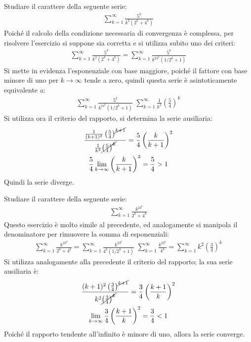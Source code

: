 \documentclass{article}
\numberwithin{equation}{subsection}
\begin{document}
Studiare il carattere della seguente serie:
\begin{gather*}
    \displaystyle\sum_{k=1}^\infty\frac{5^k}{k^2(2^k+4^k)}
\end{gather*}
Poiché il calcolo della condizione necessaria di convergenza è complessa, per risolvere l'esercizio si suppone sia corretta e si utilizza subito uno dei criteri:
\begin{gather*}
    \displaystyle\sum_{k=1}^\infty\frac{5^k}{k^2(2^k+4^k)}=
    \displaystyle\sum_{k=1}^\infty\frac{5^k}{k^24^k(1/2^k+1)}
\end{gather*}
Si mette in evidenza l'esponenziale con base maggiore, poiché il fattore con base minore di uno per $k\to\infty$ tende a zero, quindi questa serie è asintoticamente equivalente a:
\begin{gather*}
    \displaystyle\sum_{k=1}^\infty\frac{5^k}{k^24^k(1/2^k+1)}\mbox{~}
    \displaystyle\sum_{k=1}^\infty\frac{1}{k^2}\left(\frac{5}{4}\right)^k
\end{gather*}
Si utilizza ora il criterio del rapporto, si determina la serie ausiliaria:
\begin{gather*}
    \displaystyle\frac{\frac{1}{(k+1)^2}\left(\frac{5}{4}\right)^{\cancel{k+1}}}{\frac{1}{k^2}\cancel{\left(\frac{5}{4}\right)^k}}=\frac{5}{4}\left(\frac{k}{k+1}\right)^2\\
    \frac{5}{4}\lim_{k\to\infty}\left(\frac{k}{k+1}\right)^2=\frac{5}{4}>1
\end{gather*}
Quindi la serie diverge.  


Studiare il carattere della seguente serie:
\begin{gather*}
    \displaystyle\sum_{k=1}^\infty\frac{k^23^k}{2^k+4^k}
\end{gather*}
Questo esercizio è molto simile al precedente, ed analogamente si manipola il denominatore per rimuovere la somma di esponenziali:
\begin{gather*}
    \displaystyle\sum_{k=1}^\infty\frac{k^23^k}{2^k+4^k}=
    \displaystyle\sum_{k=1}^\infty\frac{k^23^k}{4^k(1/2^k+1)}\mbox{~}
    \displaystyle\sum_{k=1}^\infty\frac{k^23^k}{4^k}=
    \displaystyle\sum_{k=1}^\infty k^2\left(\frac{3}{4}\right)^k
\end{gather*}
Si utilizza analogamente alla precedente il criterio del rapporto; la sua serie ausiliaria è:
\begin{gather*}
    \displaystyle\frac{(k+1)^2\left(\frac{3}{4}\right)^{\cancel{k+1}}}{k^2\cancel{\left(\frac{3}{4}\right)^k}}=\frac{3}{4}\left(\frac{k+1}{k}\right)^2\\
    \lim_{k\to\infty}\frac{3}{4}\left(\frac{k+1}{k}\right)^2=\frac{3}{4}<1
\end{gather*}
Poiché il rapporto tendente all'infinito è minore di uno, allora la serie converge. 
\end{document}
